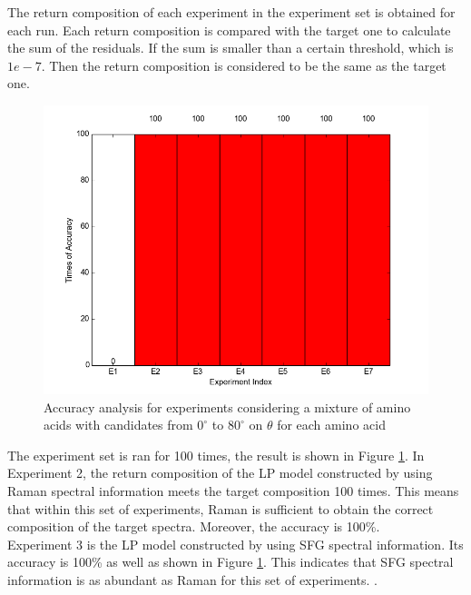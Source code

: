 The return composition of each experiment in the experiment set is obtained for each run. Each return composition is compared with the target one to calculate the sum of the residuals. If the sum is smaller than a certain threshold, which is $1e-7$. Then the return composition is considered to be the same as the target one. \\


\begin{figure}[!ht]
\centering
\includegraphics[scale=0.7]{Figures/accuracy_pecent_result8_mixture.png}
\caption{Accuracy analysis for experiments considering a mixture of amino acids with candidates from $0^{\circ}$ to $80^{\circ}$ on $\theta$ for each amino acid}  \label{fig:5.1}
\end{figure}

The experiment set is ran for 100 times, the result is shown in 
Figure \ref{fig:5.1}. In Experiment 2, the return composition of the LP model constructed by using Raman spectral information meets the target composition 100 times. This means that within this set of experiments, Raman is sufficient to obtain the correct composition of the target spectra. Moreover, the accuracy is 100\%. \\

Experiment 3 is the LP model constructed by using SFG spectral information. Its accuracy is 100\% as well as shown in Figure \ref{fig:5.1}. This indicates that SFG spectral information is as abundant as Raman for this set of experiments. . \\

